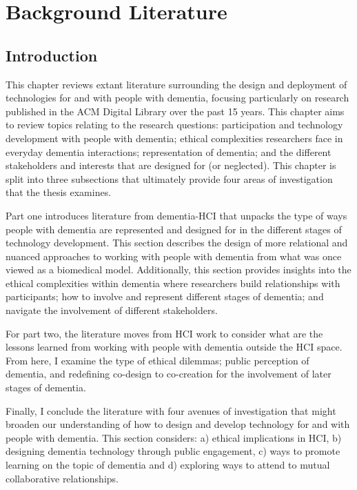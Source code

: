 \chapter{Background Literature}
\label{BackgroundLit}

\section{Introduction}
\label{BL:Intro}
This chapter reviews extant literature surrounding the design and deployment of technologies for and with people with dementia, focusing particularly on research published in the ACM Digital Library over the past 15 years. This chapter aims to review topics relating to the research questions: participation and technology development with people with dementia; ethical complexities researchers face in everyday dementia interactions; representation of dementia; and the different stakeholders and interests that are designed for (or neglected). This chapter is split into three subsections that ultimately provide four areas of investigation that the thesis examines.

Part one introduces literature from dementia-HCI that unpacks the type of ways people with dementia are represented and designed for in the different stages of technology development. This section describes the design of more relational and nuanced approaches to working with people with dementia from what was once viewed as a biomedical model. Additionally, this section provides insights into the ethical complexities within dementia where researchers build relationships with participants; how to involve and represent different stages of dementia; and navigate the involvement of different stakeholders.

For part two, the literature moves from HCI work to consider what are the lessons learned from working with people with dementia outside the HCI space. From here, I examine the type of ethical dilemmas; public perception of dementia, and redefining co-design to co-creation for the involvement of later stages of dementia.

Finally, I conclude the literature with four avenues of investigation that might broaden our understanding of how to design and develop technology for and with people with dementia. This section considers: a) ethical implications in HCI, b) designing dementia technology through public engagement, c) ways to promote learning on the topic of dementia and d) exploring ways to attend to mutual collaborative relationships.

